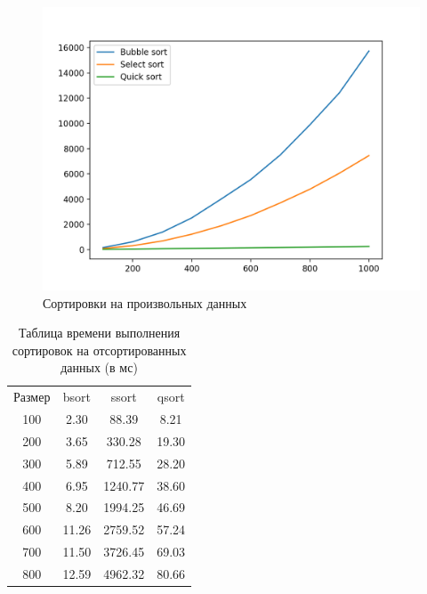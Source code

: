\documentclass{report}
\begin{document}
\begin{figure}[h!p]
	\centering
	\includegraphics[scale = 0.8]{rand.png}
	\caption{Сортировки на произвольных данных}
	\label{fig:mpr}
\end{figure}

\begin{table} [h!]
	\caption{Таблица времени выполнения сортировок на отсортированных данных (в мс)}
	\begin{center}
	\begin{tabular}{|c c c c|}

		\hline

		Размер & bsort & ssort & qsort  \\ [0.5ex]

100 & 2.30 & 88.39 & 8.21  \\ 
\hline
200 & 3.65 & 330.28 & 19.30  \\ 
\hline
300 & 5.89 & 712.55 & 28.20  \\ 
\hline
400 & 6.95 & 1240.77 & 38.60  \\ 
\hline
500 & 8.20 & 1994.25 & 46.69  \\ 
\hline
600 & 11.26 & 2759.52 & 57.24  \\ 
\hline
700 & 11.50 & 3726.45 & 69.03  \\ 
\hline
800 & 12.59 & 4962.32 & 80.66  \\ 
\hline

	\hline 
	\end{tabular}
	\end{center}
\end{table}
\end{document}
